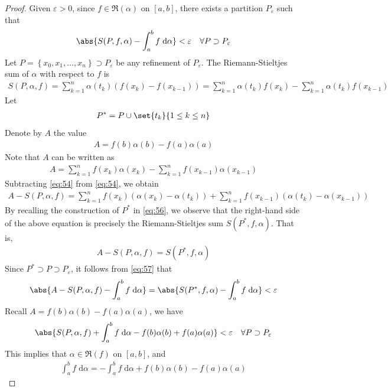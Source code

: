 \documentclass[thmcnt=section, 12pt]{elegantbook}
\begin{document}
\begin{proof}
    Given $\varepsilon > 0$, since $f \in \mathfrak{R}(\alpha)$ on $[a, b]$, there exists a partition $P_\varepsilon$ such that 
    \begin{align}
        \abs{S(P, f, \alpha) - \int_a^b f \; \mathrm{d}\alpha} < \varepsilon
        \quad \forall P \supset P_\varepsilon
        \label{eq:57}
    \end{align}
    Let $P = \left\{x_0, x_1, \ldots, x_n\right\} \supset P_\varepsilon$ be any refinement of $P_\varepsilon$. The Riemann-Stieltjes sum of $\alpha$ with respect to $f$ is 
    \begin{align}
        S(P, \alpha, f)
        = \sum_{k=1}^n \alpha(t_k) (f(x_k) - f(x_{k-1}))
        = \sum_{k=1}^n \alpha(t_k) f(x_k)
        - \sum_{k=1}^n \alpha(t_k) f(x_{k-1})
        \label{eq:54}
    \end{align}
    Let 
    \begin{align}
        P^\ast = P \cup \set{t_k}{1 \leq k \leq n}
        \label{eq:56}
    \end{align}
    Denote by $A$ the value 
    \begin{align*}
        A = f(b)\alpha(b) - f(a)\alpha(a)
    \end{align*}
    Note that $A$ can be written as 
    \begin{align}
        A = \sum_{k=1}^n f(x_k) \alpha(x_k)
        - \sum_{k=1}^n f(x_{k-1}) \alpha(x_{k-1})
        \label{eq:55}
    \end{align}
    Subtracting \eqref{eq:54} from \eqref{eq:54}, we obtain
    \begin{align*}
        A - S(P, \alpha, f)
        = \sum_{k=1}^n f(x_k) (\alpha(x_k) - \alpha(t_k))
        + \sum_{k=1}^n f(x_{k-1}) (\alpha(t_k) - \alpha(x_{k-1}))
    \end{align*}
    By recalling the construction of $P^\ast$ in \eqref{eq:56}, we observe that the right-hand side of the above equation is precisely the Riemann-Stieltjes sum $S(P^\ast, f, \alpha)$. That is, 
    \begin{align*}
        A - S(P, \alpha, f) = S(P^\ast, f, \alpha)
    \end{align*}
    Since $P^\ast \supset P \supset P_\varepsilon$, it follows from \eqref{eq:57} that 
    \begin{align*}
        \abs{A - S(P, \alpha, f) - \int_a^b f \; \mathrm{d}\alpha} 
        = \abs{S(P^\ast, f, \alpha) - \int_a^b f \; \mathrm{d}\alpha}
        < \varepsilon
    \end{align*}
    Recall $A = f(b)\alpha(b) - f(a)\alpha(a)$, we have 
    \begin{align*}
        \abs{S(P, \alpha, f) + \int_a^b f \; \mathrm{d}\alpha - f(b)\alpha(b) + f(a)\alpha(a)} < \varepsilon
        \quad \forall P \supset P_\varepsilon
    \end{align*}
    This implies that $\alpha \in \mathfrak{R}(f)$ on $[a, b]$, and 
    \begin{align*}
        \int_a^b f \;\mathrm{d}\alpha
        = -\int_a^b f \;\mathrm{d}\alpha 
        + f(b)\alpha(b) - f(a)\alpha(a)
    \end{align*}
\end{proof}
\end{document}
